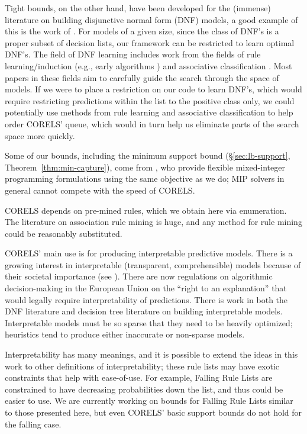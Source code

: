 Tight bounds, on the other hand, have been developed for the (immense) literature on building disjunctive normal form (DNF) models, a good example of this is the work of \citet{Rijnbeek10}.
For models of a given size, since the class of DNF's is a proper subset of decision lists, our framework can be restricted to learn optimal DNF's. The field of DNF learning includes work from the fields of rule learning/induction (e.g., early algorithms \citep{Michalski1969,ClarkNiblett1989,Frank1998}) and associative classification \citep{Vanhoof10}. Most papers in these fields aim to carefully guide the search through the space of models. If we were to place a restriction on our code to learn DNF's, which would require restricting predictions within the list to the positive class only, we could potentially use methods from rule learning and associative classification to help order CORELS' queue, which would in turn help us eliminate parts of the search space more quickly. 

Some of our bounds, including the minimum support bound (\S\ref{sec:lb-support}, Theorem~\ref{thm:min-capture}), come from \citet{RudinEr15}, who provide flexible mixed-integer programming formulations using the same objective as we do; MIP solvers in general cannot compete with the speed of CORELS.

CORELS depends on pre-mined rules, which we obtain here via enumeration.
The literature on association rule mining is huge, and any method for rule mining could be reasonably substituted.

CORELS' main use is for producing interpretable predictive models. There is a growing interest in interpretable (transparent, comprehensible) models because of their societal importance (see \citep{ruping2006learning,bratko1997machine,dawes1979robust,VellidoEtAl12,Giraud98,Holte93,Schmueli10,Huysmans11,Freitas14}). There are now regulations on algorithmic decision-making in the European Union on the ``right to an explanation'' \citep{Goodman2016EU} that would legally require interpretability of predictions. There is work in both the DNF literature \citep{Ruckert2008} and decision tree literature \citep{GarofalakisHyRaSh00} on building interpretable models. Interpretable models must be so sparse that they need to be heavily optimized; heuristics tend to produce either inaccurate or non-sparse models.

Interpretability has many meanings, and it is possible to extend the ideas in this work to other definitions of interpretability; these rule lists may have exotic constraints that help with ease-of-use. For example, Falling Rule Lists \citep{WangRu15} are constrained to have decreasing probabilities down the list, and thus could be easier to use. We are currently working on bounds for Falling Rule Lists \citep{ChenRu17} similar to those presented here, but even CORELS' basic support bounds do not hold for the falling case. 

